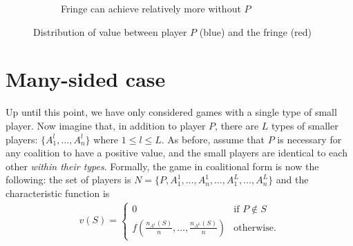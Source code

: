 \documentclass[a4paper]{article}
\begin{document}
\begin{figure}
\begin{subfigure}[b]{0.45\textwidth}
        \caption{Fringe can achieve relatively more without $P$}
    \end{subfigure}
    \caption{Distribution of value between player $P$ (blue) and the fringe (red)}
    \label{fig:non_indispensable}
\end{figure}


\section{Many-sided case}

Up until this point, we have only considered games with a single type of small player.
Now imagine that, in addition to player $P$, there are $L$ types of smaller players: $\{A^l_1, \dots, A^l_n\}$ where $1 \leq l \leq L$.
As before, assume that $P$ is necessary for any coalition to have a positive value, and the small players are identical to each other \emph{within their types}.
Formally, the game in coalitional form is now the following: the set of players is $N = \{P, A^1_1, \dots, A^1_n, \dots, A^L_1, \dots, A^L_n\}$ and the characteristic function is
\begin{align*}
    v(S) = \begin{cases}
        0                                                & \text{if } P \notin S \\
        f\left(\frac{n_{A^1}(S)}{n}, \dots, \frac{n_{A^L}(S)}{n}\right) & \text{otherwise}.
    \end{cases}
\end{align*}
\end{document}
